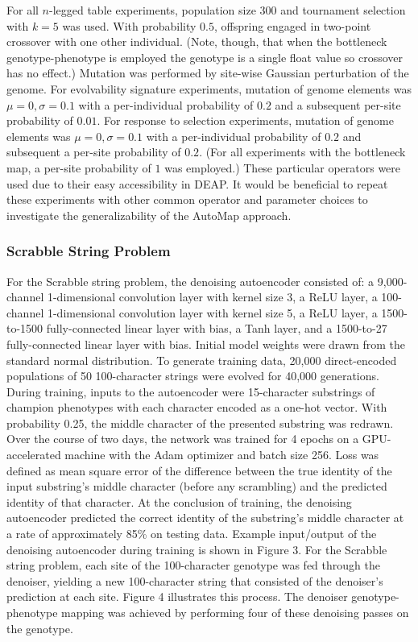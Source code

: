 For all $n$-legged table experiments, population size 300 and tournament selection with $k = 5$ was used.
With probability $0.5$, offspring engaged in two-point crossover with one other individual.
(Note, though, that when the bottleneck genotype-phenotype is employed the genotype is a single float value so crossover has no effect.)
Mutation was performed by site-wise Gaussian perturbation of the genome.
For evolvability signature experiments, mutation of genome elements was $\mu=0, \sigma=0.1$ with a per-individual probability of $0.2$ and a subsequent per-site probability of $0.01$.
For response to selection experiments, mutation of genome elements was $\mu=0, \sigma=0.1$ with a per-individual probability of $0.2$ and subsequent a per-site probability of $0.2$.
(For all experiments with the bottleneck map, a per-site probability of $1$ was employed.)
These particular operators were used due to their easy accessibility in DEAP.
It would be beneficial to repeat these experiments with other common operator and parameter choices to investigate the generalizability of the AutoMap approach.

\subsubsection{Scrabble String Problem}




For the Scrabble string problem, the denoising autoencoder consisted of: a 9,000-channel 1-dimensional convolution layer with kernel size 3, a ReLU layer, a 100-channel 1-dimensional convolution layer with kernel size 5, a ReLU layer, a 1500-to-1500 fully-connected linear layer with bias, a Tanh layer, and a 1500-to-27 fully-connected linear layer with bias.
Initial model weights were drawn from the standard normal distribution.
To generate training data, 20,000 direct-encoded populations of 50 100-character strings were evolved for 40,000 generations.
During training, inputs to the autoencoder were 15-character substrings of champion phenotypes with each character encoded as a one-hot vector.
With probability 0.25, the middle character of the presented substring was redrawn.
Over the course of two days, the network was trained for 4 epochs on a GPU-accelerated machine with the Adam optimizer and batch size 256.
Loss was defined as mean square error of the difference between the true identity of the input substring's middle character (before any scrambling) and the predicted identity of that character.
At the conclusion of training, the denoising autoencoder predicted the correct identity of the substring's middle character at a rate of approximately 85\% on testing data.
Example input/output of the denoising autoencoder during training is shown in Figure 3.
For the Scrabble string problem, each site of the 100-character genotype was fed through the denoiser, yielding a new 100-character string that consisted of the denoiser's prediction at each site.
Figure 4 illustrates this process.
The denoiser genotype-phenotype mapping was achieved by performing four of these denoising passes on the genotype.

